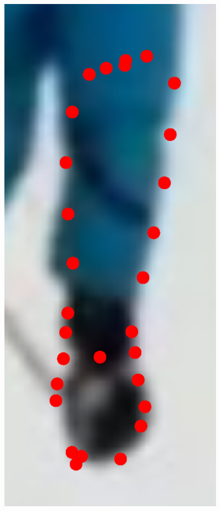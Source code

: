 \begin{figure}[!t]
    \includegraphics[height=\ofh]{resources/Annotation_Correction/Fittings/31.eps}
    \hfill

\end{figure}
